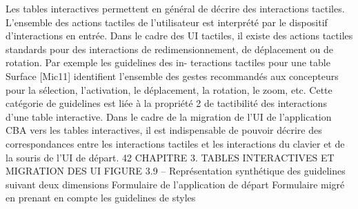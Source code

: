 \documentclass{article}
\begin{document}
Les tables interactives permettent en général de décrire
des interactions tactiles. L’ensemble des actions tactiles de l’utilisateur est interprété par le dispositif
d’interactions en entrée. Dans le cadre des UI tactiles, il existe des actions tactiles standards pour des
interactions de redimensionnement, de déplacement ou de rotation. Par exemple les guidelines des in-
teractions tactiles pour une table Surface [Mic11] identiﬁent l’ensemble des gestes recommandés aux
concepteurs pour la sélection, l’activation, le déplacement, la rotation, le zoom, etc. Cette catégorie
de guidelines est liée à la propriété 2 de tactibilité des interactions d’une table interactive.
Dans le cadre de la migration de l’UI de l’application CBA vers les tables interactives, il est
indispensable de pouvoir décrire des correspondances entre les interactions tactiles et les interactions
du clavier et de la souris de l’UI de départ.
42
CHAPITRE 3. TABLES INTERACTIVES ET MIGRATION DES UI
FIGURE 3.9 – Représentation synthétique des guidelines suivant deux dimensions
Formulaire de l’application de départ
Formulaire migré en prenant en compte les
guidelines de styles
 
\end{document}
